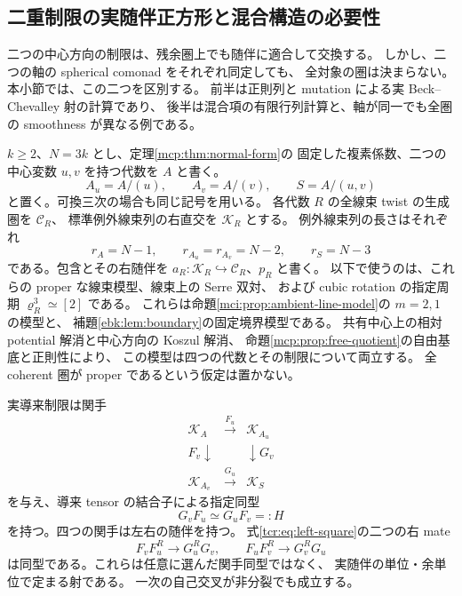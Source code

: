 \subsection{二重制限の実随伴正方形と混合構造の必要性}
\label{tcr:subsec:restriction-square}

二つの中心方向の制限は、残余圏上でも随伴に適合して交換する。
しかし、二つの軸の spherical comonad をそれぞれ同定しても、
全対象の圏は決まらない。本小節では、この二つを区別する。
前半は正則列と mutation による実 Beck--Chevalley 射の計算であり、
後半は混合項の有限行列計算と、軸が同一でも全圏の smoothness が異なる例である。

$k\ge2$、$N=3k$ とし、定理\ref{mcp:thm:normal-form}の
固定した複素係数、二つの中心変数 $u,v$ を持つ代数を $A$ と書く。
\[
 A_u=A/(u),\qquad A_v=A/(v),\qquad S=A/(u,v)
\]
と置く。可換三次の場合も同じ記号を用いる。
各代数 $R$ の全線束 twist の生成圏を $\mathcal C_R$、
標準例外線束列の右直交を $\mathcal K_R$ とする。
例外線束列の長さはそれぞれ
\[
 r_A=N-1,\qquad r_{A_u}=r_{A_v}=N-2,\qquad r_S=N-3
\]
である。包含とその右随伴を
$a_R:\mathcal K_R\hookrightarrow\mathcal C_R$、$p_R$ と書く。
以下で使うのは、これらの proper な線束模型、線束上の Serre 双対、
および cubic rotation の指定周期 $\varrho_R^3\simeq[2]$ である。
これらは命題\ref{mci:prop:ambient-line-model}の $m=2,1$ の模型と、
補題\ref{ebk:lem:boundary}の固定境界模型である。
共有中心上の相対 potential 解消と中心方向の Koszul 解消、
命題\ref{mcp:prop:free-quotient}の自由基底と正則性により、
この模型は四つの代数とその制限について両立する。
全 coherent 圏が proper であるという仮定は置かない。

\begin{proposition}
\label{tcr:prop:beck-chevalley}
実導来制限は関手
\[
 \begin{array}{ccc}
 \mathcal K_A&\xrightarrow{F_u}&\mathcal K_{A_u}\\
 {\scriptstyle F_v}\downarrow&&\downarrow{\scriptstyle G_v}\\
 \mathcal K_{A_v}&\xrightarrow{G_u}&\mathcal K_S
 \end{array}
\]
を与え、導来 tensor の結合子による指定同型
\begin{equation}\label{tcr:eq:left-square}
                  G_vF_u\simeq G_uF_v=:H
\end{equation}
を持つ。四つの関手は左右の随伴を持つ。
式\eqref{tcr:eq:left-square}の二つの右 mate
\begin{equation}\label{tcr:eq:bc}
       F_vF_u^R\longrightarrow G_u^RG_v,
       \qquad F_uF_v^R\longrightarrow G_v^RG_u
\end{equation}
は同型である。これらは任意に選んだ関手同型ではなく、
実随伴の単位・余単位で定まる射である。
一次の自己交叉が非分裂でも成立する。
\end{proposition}

